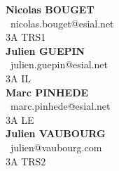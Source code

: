 \documentclass[10pt]{article}
\begin{document}
\thispagestyle{empty}

\begin{multicols}{2}
{\large
	\noindent{}\textbf{Nicolas BOUGET}\\
	\Letter~nicolas.bouget@esial.net\\
	3A TRS1\\

	\noindent{}\textbf{Julien GUEPIN}\\
	\Letter~julien.guepin@esial.net\\
	3A IL\\

	\noindent{}\textbf{Marc PINHEDE}\\
	\Letter~marc.pinhede@esial.net\\
	3A LE\\

	\noindent{}\textbf{Julien VAUBOURG}\\
	\Letter~julien@vaubourg.com\\
	3A TRS2\\
}
\end{multicols}

\vspace{1cm}
\end{document}
